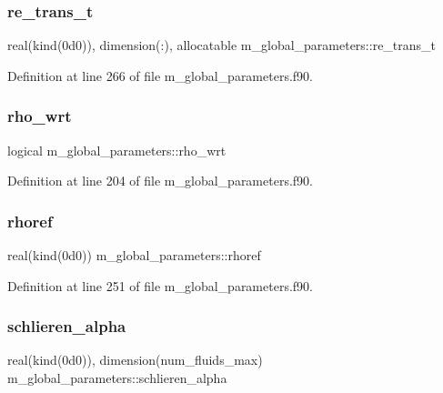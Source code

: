 \subsubsection{\texorpdfstring{re\+\_\+trans\+\_\+t}{re\_trans\_t}}
{\footnotesize\ttfamily real(kind(0d0)), dimension(\+:), allocatable m\+\_\+global\+\_\+parameters\+::re\+\_\+trans\+\_\+t}



Definition at line 266 of file m\+\_\+global\+\_\+parameters.\+f90.

\mbox{\label{namespacem__global__parameters_aabc3362b8f53b08f4f113e699d449754}} 
\subsubsection{\texorpdfstring{rho\+\_\+wrt}{rho\_wrt}}
{\footnotesize\ttfamily logical m\+\_\+global\+\_\+parameters\+::rho\+\_\+wrt}



Definition at line 204 of file m\+\_\+global\+\_\+parameters.\+f90.

\mbox{\label{namespacem__global__parameters_a485a360d73013d7bce1daa01df404534}} 
\subsubsection{\texorpdfstring{rhoref}{rhoref}}
{\footnotesize\ttfamily real(kind(0d0)) m\+\_\+global\+\_\+parameters\+::rhoref}



Definition at line 251 of file m\+\_\+global\+\_\+parameters.\+f90.

\mbox{\label{namespacem__global__parameters_ada8a4a23b5804dfa9843b25ddd1cd8c1}} 
\subsubsection{\texorpdfstring{schlieren\+\_\+alpha}{schlieren\_alpha}}
{\footnotesize\ttfamily real(kind(0d0)), dimension(num\+\_\+fluids\+\_\+max) m\+\_\+global\+\_\+parameters\+::schlieren\+\_\+alpha}




